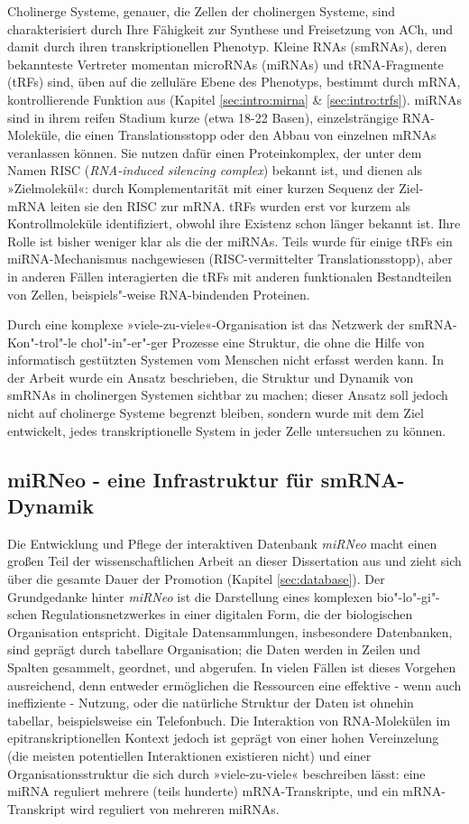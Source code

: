 Cholinerge Systeme, genauer, die Zellen der cholinergen Systeme, sind charakterisiert durch Ihre Fähigkeit zur Synthese und Freisetzung von ACh, und damit durch ihren transkriptionellen Phenotyp. Kleine RNAs (smRNAs), deren bekannteste Vertreter momentan microRNAs (miRNAs) und tRNA-Fragmente (tRFs) sind, üben auf die zelluläre Ebene des Phenotyps, bestimmt durch mRNA, kontrollierende Funktion aus (Kapitel \ref{sec:intro:mirna} \& \ref{sec:intro:trfs}). miRNAs sind in ihrem reifen Stadium kurze (etwa 18-22 Basen), einzelsträngige RNA-Moleküle, die einen Translationsstopp oder den Abbau von einzelnen mRNAs veranlassen können. Sie nutzen dafür einen Proteinkomplex, der unter dem Namen RISC (\emph{RNA-induced silencing complex}) bekannt ist, und dienen als »Zielmolekül«: durch Komplementarität mit einer kurzen Sequenz der Ziel-mRNA leiten sie den RISC zur mRNA. tRFs wurden erst vor kurzem als Kontrollmoleküle identifiziert, obwohl ihre Existenz schon länger bekannt ist. Ihre Rolle ist bisher weniger klar als die der miRNAs. Teils wurde für einige tRFs ein miRNA-Mechanismus nachgewiesen (RISC-vermittelter Translationsstopp), aber in anderen Fällen interagierten die tRFs mit anderen funktionalen Bestandteilen von Zellen, beispiels"-weise RNA-bindenden Proteinen.

Durch eine komplexe »viele-zu-viele«-Organisation ist das Netzwerk der smRNA-Kon"-trol"-le chol"-in"-er"-ger Prozesse eine Struktur, die ohne die Hilfe von informatisch gestützten Systemen vom Menschen nicht erfasst werden kann. In der Arbeit wurde ein Ansatz beschrieben, die Struktur und Dynamik von smRNAs in cholinergen Systemen sichtbar zu machen; dieser Ansatz soll jedoch nicht auf cholinerge Systeme begrenzt bleiben, sondern wurde mit dem Ziel entwickelt, jedes transkriptionelle System in jeder Zelle untersuchen zu können.

\subsection{miRNeo - eine Infrastruktur für smRNA-Dynamik}
Die Entwicklung und Pflege der interaktiven Datenbank \emph{miRNeo} macht einen großen Teil der wissenschaftlichen Arbeit an dieser Dissertation aus und zieht sich über die gesamte Dauer der Promotion (Kapitel \ref{sec:database}). Der Grundgedanke hinter \emph{miRNeo} ist die Darstellung eines komplexen bio"-lo"-gi"-schen Regulationsnetzwerkes in einer digitalen Form, die der biologischen Organisation entspricht. Digitale Datensammlungen, insbesondere Datenbanken, sind geprägt durch tabellare Organisation; die Daten werden in Zeilen und Spalten gesammelt, geordnet, und abgerufen. In vielen Fällen ist dieses Vorgehen ausreichend, denn entweder ermöglichen die Ressourcen eine effektive - wenn auch ineffiziente - Nutzung, oder die natürliche Struktur der Daten ist ohnehin tabellar, beispielsweise ein Telefonbuch. Die Interaktion von RNA-Molekülen im epitranskriptionellen Kontext jedoch ist geprägt von einer hohen Vereinzelung (die meisten potentiellen Interaktionen existieren nicht) und einer Organisationsstruktur die sich durch »viele-zu-viele« beschreiben lässt: eine miRNA reguliert mehrere (teils hunderte) mRNA-Transkripte, und ein mRNA-Transkript wird reguliert von mehreren miRNAs.

